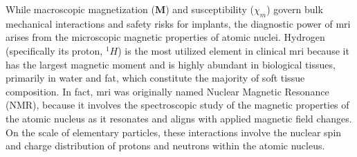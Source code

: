 %
%
%
%
%
%
%

While macroscopic magnetization ($\mathbf{M}$) and susceptibility ($\chi_m$) govern bulk mechanical interactions and safety risks for implants, the diagnostic power of \gls{mri} arises from the microscopic magnetic properties of atomic nuclei. Hydrogen (specifically its proton, $^1H$) is the most utilized element in clinical \gls{mri} because it has the largest magnetic moment and is highly abundant in biological tissues, primarily in water and fat, which constitute the majority of soft tissue composition. In fact, \gls{mri} was originally named Nuclear Magnetic Resonance (NMR), because it involves the spectroscopic study of the magnetic properties of the atomic nucleus as it resonates and aligns with applied magnetic field changes. On the scale of elementary particles, these interactions involve the nuclear spin and charge distribution of protons and neutrons within the atomic nucleus. 

